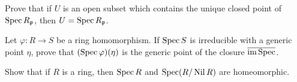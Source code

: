 \begin{problems}
\begin{problems}
		\item Prove that if $U$ is an open subset which contains the unique closed point of $\operatorname{Spec} R_{\mathfrak{p}}$, then $U = \operatorname{Spec} R_{\mathfrak{p}}$.
	\end{problems}
	
	\item Let $\varphi \colon R \to S$ be a ring homomorphism. If $\operatorname{Spec} S$ is irreducible with a generic point $\eta$, prove that $(\operatorname{Spec}\varphi)(\eta)$ is the generic point of the closure $\overline{\operatorname{im}\operatorname{Spec}}$.
	
	\item Show that if $R$ is a ring, then $\operatorname{Spec} R$ and $\operatorname{Spec}(R/\operatorname{Nil}{R})$ are homeomorphic.
\end{problems}

